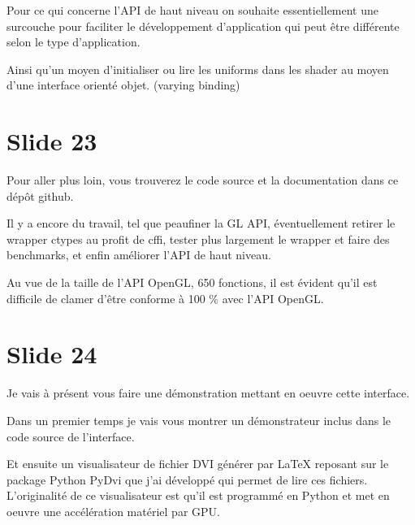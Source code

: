 \documentclass[12pt]{article}
\begin{document}
Pour ce qui concerne l'API de haut niveau on souhaite essentiellement une surcouche pour faciliter
le développement d'application qui peut être différente selon le type d'application.

Ainsi qu'un moyen d'initialiser ou lire les uniforms dans les shader au moyen d'une interface
orienté objet. (varying binding)

\section{Slide 23}

Pour aller plus loin,
vous trouverez le code source et la documentation dans ce dépôt github.

Il y a encore du travail,
tel que peaufiner la GL API,
éventuellement retirer le wrapper ctypes au profit de cffi,
tester plus largement le wrapper et faire des benchmarks,
et enfin améliorer l'API de haut niveau.

Au vue de la taille de l'API OpenGL, 650 fonctions, il est évident qu'il est difficile de clamer
d'être conforme à 100 \% avec l'API OpenGL.

\section{Slide 24}

Je vais à présent vous faire une démonstration mettant en oeuvre cette interface.

Dans un premier temps je vais vous montrer un démonstrateur inclus dans le code source de l'interface.

Et ensuite un visualisateur de fichier DVI générer par LaTeX reposant sur le package Python PyDvi
que j'ai développé qui permet de lire ces fichiers. L'originalité de ce visualisateur est qu'il est
programmé en Python et met en oeuvre une accélération matériel par GPU.
\end{document}

